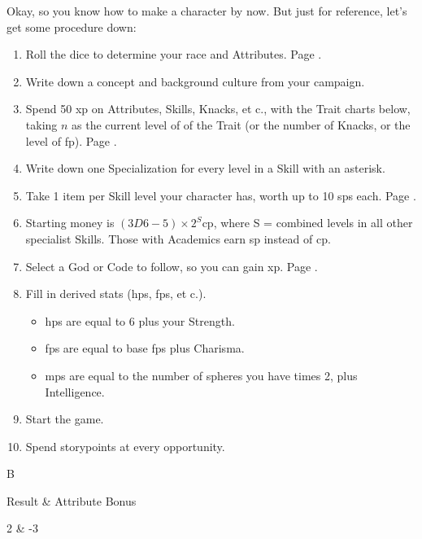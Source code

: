 \begin{multicols}{2}

\noindent
Okay, so you know how to make a character by now.  But just for reference, let's get some procedure down:

\begin{enumerate}
	\item
	Roll the dice to determine your race and Attributes.  Page \pageref{character_rolls}.
	\item
	Write down a concept and background culture from your campaign.
	\item
	Spend 50 \gls{xp} on Attributes, Skills, Knacks, et c., with the Trait charts below, taking $n$ as the current level of of the Trait (or the number of Knacks, or the level of \gls{fp}).
	Page \pageref{xp}.
	\item
	Write down one Specialization for every level in a Skill with an asterisk.
	\item
	Take 1 item per Skill level your character has, worth up to 10 \glspl{sp} each.  Page \pageref{start_equipment}.
	\item
	Starting money is $(3D6-5)\times 2^S$\gls{cp}, where S = combined levels in all other specialist Skills. Those with Academics earn \gls{sp} instead of \gls{cp}.
	\item
	Select a God or Code to follow, so you can gain \gls{xp}.  Page \pageref{gods_codes}.
	\item
	Fill in derived stats (\glspl{hp}, \glspl{fp}, et c.).
	\begin{itemize}

		\item
		\glspl{hp} are equal to 6 plus your Strength.
		\item
		\glspl{fp} are equal to base \glspl{fp} plus Charisma.
		\item
		\glspl{mp} are equal to the number of spheres you have times 2, plus Intelligence.

	\end{itemize}
	\item
	Start the game.
	\item
	Spend \glspl{storypoint} at every opportunity.
\end{enumerate}

\columnbreak

\begin{xpbox}{B}

	Result & Attribute Bonus \\\hline

	2 & -3 \\


\end{xpbox}
\end{multicols}
